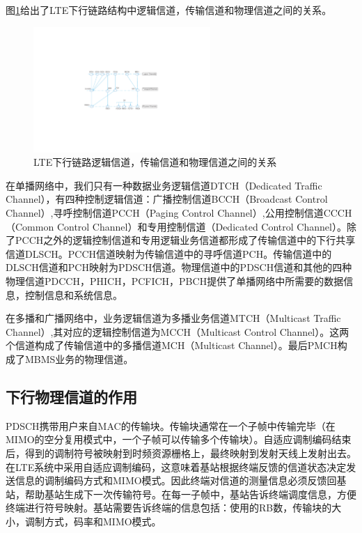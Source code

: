 \documentclass[10pt,a4paper,UTF8]{article}
\begin{document}
图\ref{fig:orgparagraph6}给出了LTE下行链路结构中逻辑信道，传输信道和物理信道之间的关系。
\begin{figure}[htb]
\centering
\includegraphics[width=0.6\textwidth]{../../img/20151101ltephysicalchannel.pdf}
\caption{\label{fig:orgparagraph6}
LTE下行链路逻辑信道，传输信道和物理信道之间的关系}
\end{figure}

在单播网络中，我们只有一种数据业务逻辑信道DTCH（Dedicated Traffic Channel），有四种控制逻辑信道：广播控制信道BCCH（Broadcast Control Channel）,寻呼控制信道PCCH（Paging Control Channel）,公用控制信道CCCH（Common Control Channel）和专用控制信道（Dedicated Control Channel）。除了PCCH之外的逻辑控制信道和专用逻辑业务信道都形成了传输信道中的下行共享信道DLSCH。PCCH信道映射为传输信道中的寻呼信道PCH。传输信道中的DLSCH信道和PCH映射为PDSCH信道。物理信道中的PDSCH信道和其他的四种物理信道PDCCH，PHICH，PCFICH，PBCH提供了单播网络中所需要的数据信息，控制信息和系统信息。

在多播和广播网络中，业务逻辑信道为多播业务信道MTCH（Multicast Traffic Channel）,其对应的逻辑控制信道为MCCH（Multicast Control Channel）。这两个信道构成了传输信道中的多播信道MCH（Multicast Channel）。最后PMCH构成了MBMS业务的物理信道。
\subsection{下行物理信道的作用}
\label{sec:orgheadline17}


PDSCH携带用户来自MAC的传输块。传输块通常在一个子帧中传输完毕（在MIMO的空分复用模式中，一个子帧可以传输多个传输块）。自适应调制编码结束后，得到的调制符号被映射到时频资源栅格上，最终映射到发射天线上发射出去。在LTE系统中采用自适应调制编码，这意味着基站根据终端反馈的信道状态决定发送信息的调制编码方式和MIMO模式。因此终端对信道的测量信息必须反馈回基站，帮助基站生成下一次传输符号。在每一子帧中，基站告诉终端调度信息，方便终端进行符号映射。基站需要告诉终端的信息包括：使用的RB数，传输块的大小，调制方式，码率和MIMO模式。
\end{document}

